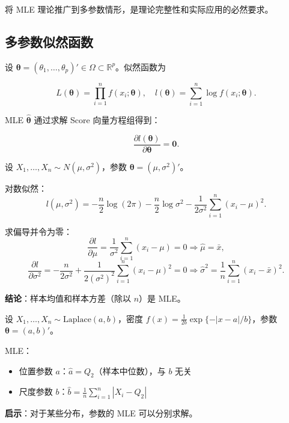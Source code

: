 将 MLE 理论推广到多参数情形，是理论完整性和实际应用的必然要求。

\subsection{多参数似然函数}

设 $\boldsymbol{\theta} = (\theta_1, \ldots, \theta_p)' \in \Omega \subset \mathbb{R}^p$。似然函数为

\[
L(\boldsymbol{\theta}) = \prod_{i=1}^n f(x_i; \boldsymbol{\theta}), \quad l(\boldsymbol{\theta}) = \sum_{i=1}^n \log f(x_i; \boldsymbol{\theta}).
\label{eq:multiparameter-likelihood}
\]

MLE $\widehat{\boldsymbol{\theta}}$ 通过求解 Score 向量方程组得到：

\[
\frac{\partial l(\boldsymbol{\theta})}{\partial \boldsymbol{\theta}} = \mathbf{0}.
\label{eq:score-equation-multiparameter}
\]

\begin{example}\label{ex:normal-mle-multiparameter}
设 $X_1, \ldots, X_n \sim N(\mu, \sigma^2)$，参数 $\boldsymbol{\theta} = (\mu, \sigma^2)'$。

对数似然：
\[
l(\mu, \sigma^2) = -\frac{n}{2}\log(2\pi) - \frac{n}{2}\log\sigma^2 - \frac{1}{2\sigma^2}\sum_{i=1}^n (x_i - \mu)^2.
\]

求偏导并令为零：
\[
\frac{\partial l}{\partial \mu} = \frac{1}{\sigma^2}\sum_{i=1}^n (x_i - \mu) = 0 \Rightarrow \widehat{\mu} = \bar{x},
\]
\[
\frac{\partial l}{\partial \sigma^2} = -\frac{n}{2\sigma^2} + \frac{1}{2(\sigma^2)^2}\sum_{i=1}^n (x_i - \mu)^2 = 0 \Rightarrow \widehat{\sigma}^2 = \frac{1}{n}\sum_{i=1}^n (x_i - \bar{x})^2.
\]

\textbf{结论}：样本均值和样本方差（除以 $n$）是 MLE。
\end{example}

\begin{example}\label{ex:laplace-mle-multiparameter}
设 $X_1, \ldots, X_n \sim \text{Laplace}(a, b)$，密度 $f(x) = \frac{1}{2b}\exp\{-|x-a|/b\}$，参数 $\boldsymbol{\theta} = (a, b)'$。

MLE：
\begin{itemize}
\item 位置参数 $a$：$\widehat{a} = Q_2$（样本中位数），与 $b$ 无关
\item 尺度参数 $b$：$\widehat{b} = \frac{1}{n}\sum_{i=1}^n |X_i - Q_2|$
\end{itemize}

\textbf{启示}：对于某些分布，参数的 MLE 可以分别求解。
\end{example}

